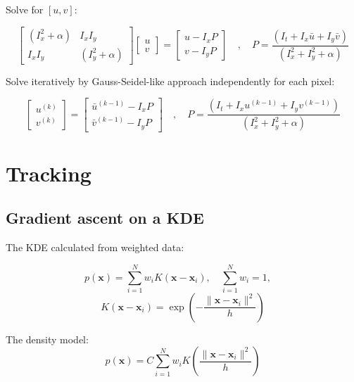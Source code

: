 \documentclass{article}
\begin{document}
\begin{multicols}{2}
	Solve for \([u, v]\):

	\[
		\begin{bmatrix}
			(I_x^2 + \alpha) & I_x I_y          \\
			I_x I_y          & (I_y^2 + \alpha)
		\end{bmatrix}
		\begin{bmatrix}
			u \\
			v
		\end{bmatrix}
		=
		\begin{bmatrix}
			u - I_x P \\
			v - I_y P
		\end{bmatrix}
		\quad , \quad P = \frac{(I_t + I_x \bar{u} + I_y \bar{v})}{(I_x^2 + I_y^2 + \alpha)}
	\]

	Solve iteratively by Gauss-Seidel-like approach independently for each pixel:

	\[
		\begin{bmatrix}
			u^{(k)} \\
			v^{(k)}
		\end{bmatrix}
		=
		\begin{bmatrix}
			\bar{u}^{(k-1)} - I_x P \\
			\bar{v}^{(k-1)} - I_y P
		\end{bmatrix}
		\quad , \quad P = \frac{(I_t + I_x u^{(k-1)} + I_y v^{(k-1)})}{(I_x^2 + I_y^2 + \alpha)}
	\]


	\section{Tracking}

	\subsection{Gradient ascent on a KDE}

	The KDE calculated from weighted data:

	\[
		p(\mathbf{x}) = \sum_{i=1}^{N} w_i K(\mathbf{x} - \mathbf{x}_i), \quad \sum_{i=1}^{N} w_i = 1, \quad
	\]
	\[
		K(\mathbf{x} - \mathbf{x}_i) = \exp\left(-\frac{\|\mathbf{x} - \mathbf{x}_i\|^2}{h}\right)
	\]

	The density model:
	\[
		p(\mathbf{x}) = C \sum_{i=1}^{N} w_i K\left(\frac{\|\mathbf{x} - \mathbf{x}_i\|^2}{h}\right)
	\]


\end{multicols}
\end{document}

